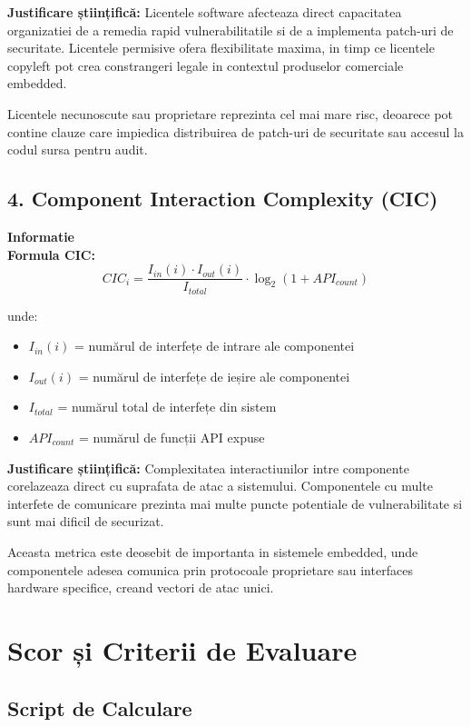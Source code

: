 \documentclass[12pt,a4paper]{article}
\newenvironment{infobox}{%
\begin{leftbar}
\color{black}
\textbf{Informatie}\\[0.5em]
}{%
\end{leftbar}
}
\begin{document}
\textbf{Justificare științifică:} Licentele software afecteaza direct capacitatea organizatiei de a remedia rapid vulnerabilitatile si de a implementa patch-uri de securitate. Licentele permisive ofera flexibilitate maxima, in timp ce licentele copyleft pot crea constrangeri legale in contextul produselor comerciale embedded.

Licentele necunoscute sau proprietare reprezinta cel mai mare risc, deoarece pot contine clauze care impiedica distribuirea de patch-uri de securitate sau accesul la codul sursa pentru audit.

\subsection{4. Component Interaction Complexity (CIC)}

\begin{infobox}
\textbf{Formula CIC:}
\[CIC_i = \frac{I_{in}(i) \cdot I_{out}(i)}{I_{total}} \cdot \log_2(1 + API_{count})\]

unde:
\begin{itemize}
\item $I_{in}(i)$ = numărul de interfețe de intrare ale componentei
\item $I_{out}(i)$ = numărul de interfețe de ieșire ale componentei
\item $I_{total}$ = numărul total de interfețe din sistem
\item $API_{count}$ = numărul de funcții API expuse
\end{itemize}
\end{infobox}

\textbf{Justificare științifică:} Complexitatea interactiunilor intre componente corelazeaza direct cu suprafata de atac a sistemului. Componentele cu multe interfete de comunicare prezinta mai multe puncte potentiale de vulnerabilitate si sunt mai dificil de securizat.

Aceasta metrica este deosebit de importanta in sistemele embedded, unde componentele adesea comunica prin protocoale proprietare sau interfaces hardware specifice, creand vectori de atac unici.

\section{Scor și Criterii de Evaluare}

\subsection{Script de Calculare}
\end{document}
